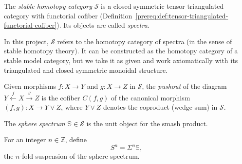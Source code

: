 \begin{definition}\label{prereq:def:stable-homotopy-category}
    \leanok
    The \emph{stable homotopy category} $\mathcal{S}$ is a closed symmetric tensor triangulated category with functorial cofiber (Definition~\ref{prereq:def:tensor-triangulated-functorial-cofiber}). Its objects are called \emph{spectra}.
\end{definition}

\begin{remark}
    In this project, $\mathcal{S}$ refers to the homotopy category of spectra (in the sense of stable homotopy theory). It can be constructed as the homotopy category of a stable model category, but we take it as given and work axiomatically with its triangulated and closed symmetric monoidal structure.
\end{remark}

\begin{definition}\label{prereq:def:pushout}
    Given morphisms $f: X \to Y$ and $g: X \to Z$ in $\mathcal{S}$, the \emph{pushout} of the diagram $Y \xleftarrow{f} X \xrightarrow{g} Z$ is the cofiber $C(f, g)$ of the canonical morphism $(f, g): X \to Y \vee Z$, where $Y \vee Z$ denotes the coproduct (wedge sum) in $\mathcal{S}$.
\end{definition}

\begin{definition}\label{prereq:def:sphere-spectrum}
    \leanok
    The \emph{sphere spectrum} $\mathbb{S} \in \mathcal{S}$ is the unit object for the smash product.
\end{definition}

\begin{definition}\label{prereq:def:sphere-Sn}
    \leanok
    For an integer $n \in \mathbb{Z}$, define
    $$S^n = \Sigma^n \mathbb{S},$$
    the $n$-fold suspension of the sphere spectrum.
\end{definition}

